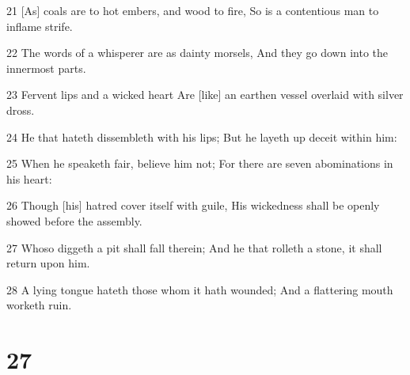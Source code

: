 \par 21 [As] coals are to hot embers, and wood to fire, So is a contentious man to inflame strife.
\par 22 The words of a whisperer are as dainty morsels, And they go down into the innermost parts.
\par 23 Fervent lips and a wicked heart Are [like] an earthen vessel overlaid with silver dross.
\par 24 He that hateth dissembleth with his lips; But he layeth up deceit within him:
\par 25 When he speaketh fair, believe him not; For there are seven abominations in his heart:
\par 26 Though [his] hatred cover itself with guile, His wickedness shall be openly showed before the assembly.
\par 27 Whoso diggeth a pit shall fall therein; And he that rolleth a stone, it shall return upon him.
\par 28 A lying tongue hateth those whom it hath wounded; And a flattering mouth worketh ruin.

\chapter{27}

